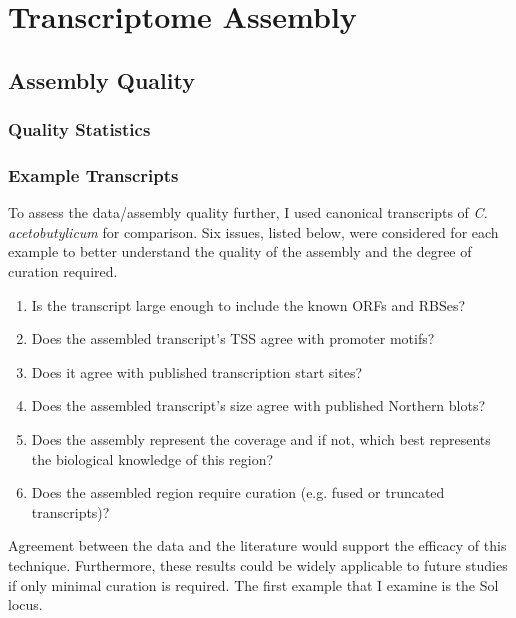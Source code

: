 

\section{Transcriptome Assembly}

\subsection{Assembly Quality}
\subsubsection{Quality Statistics}
\subsubsection{Example Transcripts}
To assess the data/assembly quality further, I used canonical transcripts of \textit{C. acetobutylicum} for comparison. Six issues, listed below, were considered for each example to better understand the quality of the assembly and the degree of curation required. 
\begin{enumerate}
\item Is the transcript large enough to include the known ORFs and RBSes?
\item Does the assembled transcript's TSS agree with promoter motifs?
\item Does it agree with published transcription start sites?
\item Does the assembled transcript's size agree with published Northern blots?
\item Does the assembly represent the coverage and if not, which best represents the biological knowledge of this region?
\item Does the assembled region require curation (e.g. fused or truncated transcripts)?
\end{enumerate}
Agreement between the data and the literature would support the efficacy of this technique. Furthermore, these results could be widely applicable to future studies if only minimal curation is required. The first example that I examine is the Sol locus.

